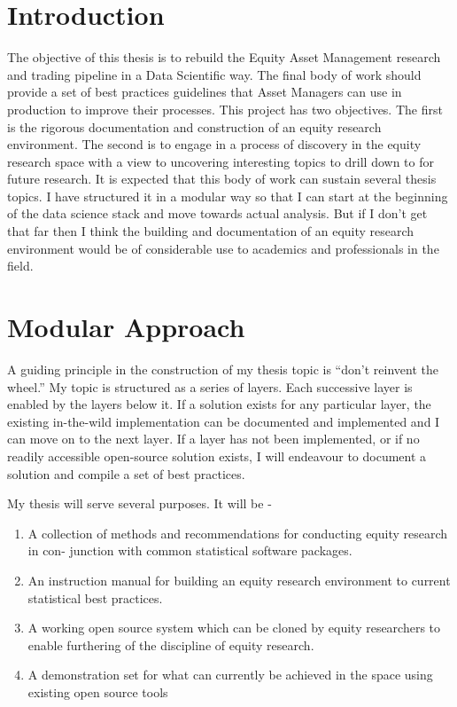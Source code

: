 \documentclass[11pt,preprint, authoryear]{elsarticle}
\numberwithin{equation}{section}
\numberwithin{figure}{section}
\numberwithin{table}{section}
\def\tightlist{} %
\begin{document}
\section{Introduction}\label{introduction}

The objective of this thesis is to rebuild the Equity Asset Management
research and trading pipeline in a Data Scientific way. The final body
of work should provide a set of best practices guidelines that Asset
Managers can use in production to improve their processes. This project
has two objectives. The first is the rigorous documentation and
construction of an equity research environment. The second is to engage
in a process of discovery in the equity research space with a view to
uncovering interesting topics to drill down to for future research. It
is expected that this body of work can sustain several thesis topics. I
have structured it in a modular way so that I can start at the beginning
of the data science stack and move towards actual analysis. But if I
don't get that far then I think the building and documentation of an
equity research environment would be of considerable use to academics
and professionals in the field.

\section{Modular Approach}\label{modular-approach}

A guiding principle in the construction of my thesis topic is ``don't
reinvent the wheel.'' My topic is structured as a series of layers. Each
successive layer is enabled by the layers below it. If a solution exists
for any particular layer, the existing in-the-wild implementation can be
documented and implemented and I can move on to the next layer. If a
layer has not been implemented, or if no readily accessible open-source
solution exists, I will endeavour to document a solution and compile a
set of best practices.

My thesis will serve several purposes. It will be -

\begin{enumerate}
\def\labelenumi{\arabic{enumi}.}
\tightlist
\item
  A collection of methods and recommendations for conducting equity
  research in con- junction with common statistical software packages.
\item
  An instruction manual for building an equity research environment to
  current statistical best practices.
\item
  A working open source system which can be cloned by equity researchers
  to enable furthering of the discipline of equity research.
\item
  A demonstration set for what can currently be achieved in the space
  using existing open source tools
\end{enumerate}
\end{document}
